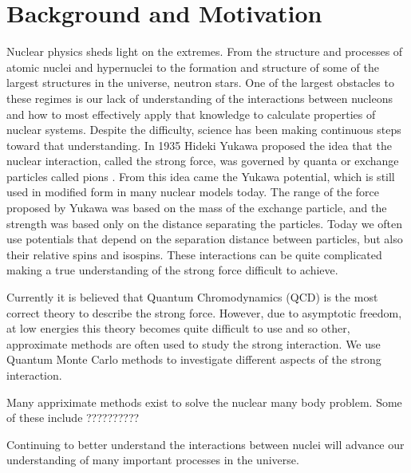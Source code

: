 \section{Background and Motivation}
Nuclear physics sheds light on the extremes. From the structure and processes of atomic nuclei and hypernuclei to the formation and structure of some of the largest structures in the universe, neutron stars. One of the largest obstacles to these regimes is our lack of understanding of the interactions between nucleons and how to most effectively apply that knowledge to calculate properties of nuclear systems. Despite the difficulty, science has been making continuous steps toward that understanding. In 1935 Hideki Yukawa proposed the idea that the nuclear interaction, called the strong force, was governed by quanta or exchange particles called pions \cite{yukawa1935}. From this idea came the Yukawa potential, which is still used in modified form in many nuclear models today. The range of the force proposed by Yukawa was based on the mass of the exchange particle, and the strength was based only on the distance separating the particles. Today we often use potentials that depend on the separation distance between particles, but also their relative spins and isospins. These interactions can be quite complicated making a true understanding of the strong force difficult to achieve.

Currently it is believed that Quantum Chromodynamics (QCD) is the most correct theory to describe the strong force. However, due to asymptotic freedom, at low energies this theory becomes quite difficult to use and so other, approximate methods are often used to study the strong interaction. We use Quantum Monte Carlo methods to investigate different aspects of the strong interaction.

Many appriximate methods exist to solve the nuclear many body problem. Some of these include ??????????

Continuing to better understand the interactions between nuclei will advance our understanding of many important processes in the universe.
